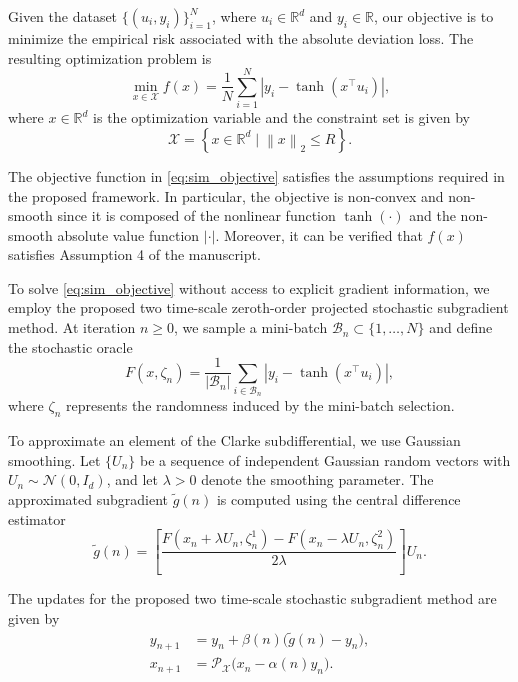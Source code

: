 \documentclass[9pt,journal,twoside,web]{ieeecolor}
\newcommand{\norm}[1]{\left\lVert #1 \right\rVert}
\begin{document}
Given the dataset $\{(u_i,y_i)\}_{i=1}^N$, where $u_i \in \mathbb{R}^d$ and $y_i \in \mathbb{R}$, our objective is to minimize the empirical risk associated with the absolute deviation loss. The resulting optimization problem is
\begin{equation}
    \min_{x\in\mathcal{X}}
    f(x)
    =
    \frac{1}{N}
    \sum_{i=1}^N
    \left| y_i - \tanh(x^\top u_i) \right|,
    \label{eq:sim_objective}
\end{equation}
where $x \in \mathbb{R}^d$ is the optimization variable and the constraint set is given by
\begin{equation}
    \mathcal{X}
    =
    \left\{
    x \in \mathbb{R}^d
    \mid
    \norm{x}_2 \leq R
    \right\}.
\end{equation}

The objective function in \eqref{eq:sim_objective} satisfies the assumptions required in the proposed framework. In particular, the objective is non-convex and non-smooth since it is composed of the nonlinear function $\tanh(\cdot)$ and the non-smooth absolute value function $|\cdot|$. Moreover, it can be verified that $f(x)$ satisfies Assumption 4 of the manuscript.

To solve \eqref{eq:sim_objective} without access to explicit gradient information, we employ the proposed two time-scale zeroth-order projected stochastic subgradient method. At iteration $n \geq 0$, we sample a mini-batch $\mathcal{B}_n \subset \{1,\dots,N\}$ and define the stochastic oracle
\[
F(x,\zeta_n)
=
\frac{1}{|\mathcal{B}_n|}
\sum_{i\in\mathcal{B}_n}
\left|
y_i-\tanh(x^\top u_i)
\right|,
\]
where $\zeta_n$ represents the randomness induced by the mini-batch selection.

To approximate an element of the Clarke subdifferential, we use Gaussian smoothing. Let $\{U_n\}$ be a sequence of independent Gaussian random vectors with $U_n \sim \mathcal{N}(0,I_d)$, and let $\lambda>0$ denote the smoothing parameter. The approximated subgradient $\tilde{g}(n)$ is computed using the central difference estimator
\begin{equation}
    \tilde{g}(n)
    =
    \left[
    \frac{
    F(x_n+\lambda U_n,\zeta_n^1)
    -
    F(x_n-\lambda U_n,\zeta_n^2)
    }{2\lambda}
    \right]
    U_n.
    \label{eq:subgrad_approx}
\end{equation}

The updates for the proposed two time-scale stochastic subgradient method are given by
\begin{align}
    y_{n+1}
    &=
    y_n
    +
    \beta(n)
    \big(
    \tilde{g}(n)-y_n
    \big),
    \label{eq:fast_update}
    \\
    x_{n+1}
    &=
    \mathcal{P}_{\mathcal{X}}
    \big(
    x_n-\alpha(n)y_n
    \big).
    \label{eq:slow_update}
\end{align}
\end{document}
